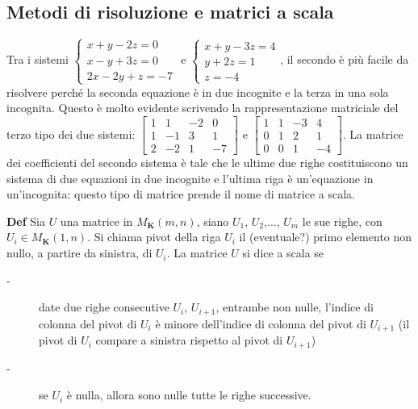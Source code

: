 \documentclass{article}
\begin{document}
\subsection{Metodi di risoluzione e matrici a scala}

Tra i sistemi $\left\{ 
\begin{array}{c}
x+y-2z=0 \\ 
x-y+3z=0 \\ 
2x-2y+z=-7%
\end{array}%
\right. $ e $\left\{ 
\begin{array}{c}
x+y-3z=4 \\ 
y+2z=1 \\ 
z=-4%
\end{array}%
\right. $, il secondo \`{e} pi\`{u} facile da risolvere perch\'{e} la
seconda equazione \`{e} in due incognite e la terza in una sola incognita.
Questo \`{e} molto evidente scrivendo la rappresentazione matriciale del
terzo tipo dei due sistemi: $\left[ 
\begin{array}{cccc}
1 & 1 & -2 & 0 \\ 
1 & -1 & 3 & 1 \\ 
2 & -2 & 1 & -7%
\end{array}%
\right] $ e $\left[ 
\begin{array}{cccc}
1 & 1 & -3 & 4 \\ 
0 & 1 & 2 & 1 \\ 
0 & 0 & 1 & -4%
\end{array}%
\right] $. La matrice dei coefficienti del secondo sistema \`{e} tale che le
ultime due righe costituiscono un sistema di due equazioni in due incognite
e l'ultima riga \`{e} un'equazione in un'incognita: questo tipo di matrice
prende il nome di matrice a scala.

\textbf{Def} Sia $U$ una matrice in $M_{\mathbf{K}}\left( m,n\right) $,
siano $U_{1}$, $U_{2}$,..., $U_{m}$ le sue righe, con $U_{i}\in M_{\mathbf{K}%
}\left( 1,n\right) $. Si chiama pivot della riga $U_{i}$ il (eventuale?)
primo elemento non nullo, a partire da sinistra, di $U_{i}$. La matrice $U$
si dice a scala se

\begin{description}
\item[-] date due righe consecutive $U_{i}$, $U_{i+1}$, entrambe non nulle,
l'indice di colonna del pivot di $U_{i}$ \`{e} minore dell'indice di colonna
del pivot di $U_{i+1}$ (il pivot di $U_{i}$ compare a sinistra rispetto al
pivot di $U_{i+1}$)

\item[-] se $U_{i}$ \`{e} nulla, allora sono nulle tutte le righe successive.
\end{description}
\end{document}
